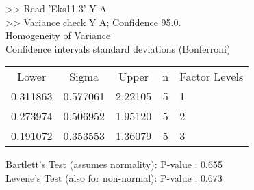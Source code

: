 \begin{enumerate}
\begin{center}
{\begin{minipage}{9cm}
>> Read 'Eks11.3' Y A\\
>> Variance check Y A; Confidence 95.0. \\
Homogeneity of Variance\\
Confidence intervals standard deviations (Bonferroni)\\
 \begin{tabular}{ccccl}
  Lower  &   Sigma  &   Upper  & n & Factor Levels\\[0.1cm]
0.311863 & 0.577061 &  2.22105 & 5 & 1 \\
0.273974 & 0.506952 &  1.95120 & 5 & 2 \\
0.191072 & 0.353553 &  1.36079 & 5 & 3
\end{tabular} 
Bartlett's Test (assumes normality): P-value : 0.655\\
Levene's Test (also for non-normal): P-value : 0.673\\[0.2cm]
\end{minipage}} \end{center}



\end{enumerate}
\normalsize
